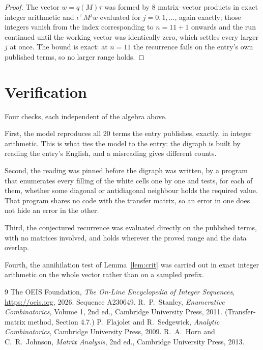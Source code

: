 \documentclass[11pt,a4paper]{article}
\theoremstyle{plain}
\theoremstyle{definition}
\begin{document}
\begin{proof}
The vector $w=q(M)\tau$ was formed by $8$ matrix--vector products in exact integer
arithmetic and $\iota^{\!\top}M^{j}w$ evaluated for $j=0,1,\dots$, again exactly; those
integers vanish from the index corresponding to $n=11+1$ onwards and the run continued
until the working vector was identically zero, which settles every larger $j$ at once. The bound is exact: at $n=11$ the recurrence fails on the entry's own published terms, so no larger range holds.
\end{proof}

\section{Verification}

Four checks, each independent of the algebra above.

First, the model reproduces all $20$ terms the entry publishes, exactly, in integer
arithmetic. This is what ties the model to the entry: the digraph is built by reading the
entry's English, and a misreading gives different counts.

Second, the reading was pinned before the digraph was written, by a program that enumerates
every filling of the white cells one by one and tests, for each of them, whether some
diagonal or antidiagonal neighbour holds the required value. That program shares no code with the transfer matrix, so an error in one does not
hide an error in the other.

Third, the conjectured recurrence was evaluated directly on the published terms, with no
matrices involved, and holds wherever the proved range and the data overlap.

Fourth, the annihilation test of Lemma~\ref{lem:crit} was carried out in exact integer
arithmetic on the whole vector rather than on a sampled prefix.

\begin{thebibliography}{9}
 The OEIS Foundation, \emph{The On-Line Encyclopedia of Integer
Sequences}, \url{https://oeis.org}, 2026. Sequence A230649.
 R.~P.~Stanley, \emph{Enumerative Combinatorics}, Volume 1, 2nd ed.,
Cambridge University Press, 2011. (Transfer-matrix method, Section 4.7.)
 P.~Flajolet and R.~Sedgewick, \emph{Analytic Combinatorics}, Cambridge
University Press, 2009.
 R.~A.~Horn and C.~R.~Johnson, \emph{Matrix Analysis}, 2nd ed., Cambridge
University Press, 2013.
\end{thebibliography}
\end{document}
